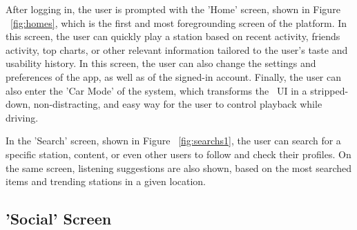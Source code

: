 After logging in, the user is prompted with the 'Home' screen, shown in Figure ~\ref{fig:homes}, which is the first and most foregrounding screen of the platform. In this screen, the user can quickly play a station based on recent activity, friends activity, top charts, or other relevant information tailored to the user's taste and usability history. In this screen, the user can also change the settings and preferences of the app, as well as of the signed-in account. Finally, the user can also enter the 'Car Mode' of the system, which transforms the ~\ac{UI} in a stripped-down, non-distracting, and easy way for the user to control playback while driving.

In the 'Search' screen, shown in Figure ~\ref{fig:searchs1}, the user can search for a specific station, content, or even other users to follow and check their profiles. On the same screen, listening suggestions are also shown, based on the most searched items and trending stations in a given location.

\newpage
\subsection{'Social' Screen}

